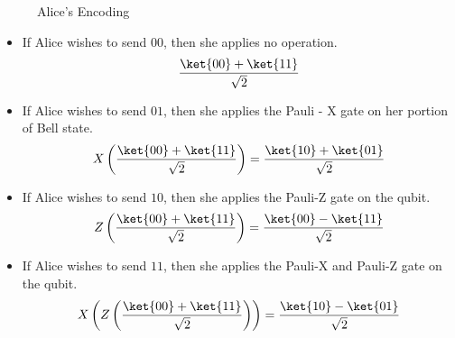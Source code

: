 \documentclass[12pt, oneside]{book}
\theoremstyle{definition}
\theoremstyle{definition}
\theoremstyle{remark}
\begin{document}
\begin{enumerate}
\begin{figure}[H]
        \caption{Alice's Encoding}
        \label{fig:superdense2}
    \end{figure}
    \begin{itemize}
        \item If Alice wishes to send $00$, then she applies no operation.
        \[
            \frac{\ket{00}+\ket{11}}{\sqrt{2}}
        \]
        \item If Alice wishes to send $01$, then she applies the Pauli - X gate on her portion of Bell state.
        \[
            X\left(\frac{\ket{00}+\ket{11}}{\sqrt{2}}\right)=\frac{\ket{10}+\ket{01}}{\sqrt{2}}
        \]
        \item If Alice wishes to send $10$, then she applies the Pauli-Z gate on the qubit.
        \[
            Z\left(\frac{\ket{00}+\ket{11}}{\sqrt{2}}\right)=\frac{\ket{00}-\ket{11}}{\sqrt{2}}
        \]
        \item If Alice wishes to send $11$, then she applies the Pauli-X and Pauli-Z gate on the qubit.
        \[
            X\left(Z\left(\frac{\ket{00}+\ket{11}}{\sqrt{2}}\right)\right)=\frac{\ket{10}-\ket{01}}{\sqrt{2}}
        \]


\end{itemize}
\end{enumerate}
\end{document}
